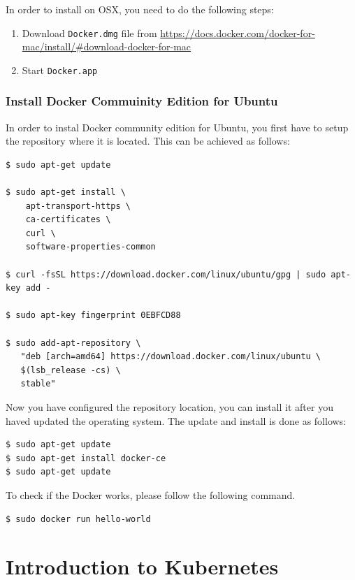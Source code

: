 In order to install on OSX, you need to do the following steps:

\begin{enumerate}
\def\labelenumi{\arabic{enumi}.}
\item
  Download \texttt{Docker.dmg} file from
  \href{}{https://docs.docker.com/docker-for-mac/install/\#download-docker-for-mac}
\item
  Start \texttt{Docker.app}
\end{enumerate}

\subsubsection{Install Docker Commuinity Edition for
Ubuntu}\label{install-docker-commuinity-edition-for-ubuntu}

In order to instal Docker community edition for Ubuntu, you first have
to setup the repository where it is located. This can be achieved as
follows:

\begin{verbatim}
$ sudo apt-get update

$ sudo apt-get install \
    apt-transport-https \
    ca-certificates \
    curl \
    software-properties-common

$ curl -fsSL https://download.docker.com/linux/ubuntu/gpg | sudo apt-key add -

$ sudo apt-key fingerprint 0EBFCD88

$ sudo add-apt-repository \
   "deb [arch=amd64] https://download.docker.com/linux/ubuntu \
   $(lsb_release -cs) \
   stable"
\end{verbatim}

Now you have configured the repository location, you can install it
after you haved updated the operating system. The update and install is
done as follows:

\begin{verbatim}
$ sudo apt-get update
$ sudo apt-get install docker-ce
$ sudo apt-get update
\end{verbatim}

To check if the Docker works, please follow the following command.

\begin{verbatim}
$ sudo docker run hello-world
\end{verbatim}

\section{Introduction to Kubernetes}\label{introduction-to-kubernetes}

